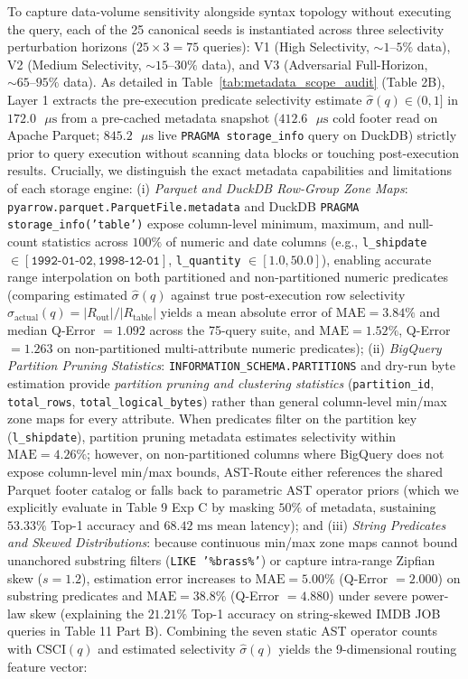 \documentclass[10pt,a4paper]{article}
\begin{document}
To capture data-volume sensitivity alongside syntax topology without executing the query, each of the 25 canonical seeds is instantiated across three selectivity perturbation horizons ($25 \times 3 = 75$ queries): V1 (High Selectivity, $\sim 1\text{--}5\%$ data), V2 (Medium Selectivity, $\sim 15\text{--}30\%$ data), and V3 (Adversarial Full-Horizon, $\sim 65\text{--}95\%$ data). As detailed in Table~\ref{tab:metadata_scope_audit} (Table 2B), Layer 1 extracts the pre-execution predicate selectivity estimate $\hat{\sigma}(q) \in (0, 1]$ in $172.0\text{ }\mu\text{s}$ from a pre-cached metadata snapshot ($412.6\text{ }\mu\text{s}$ cold footer read on Apache Parquet; $845.2\text{ }\mu\text{s}$ live \texttt{PRAGMA storage\_info} query on DuckDB) strictly prior to query execution without scanning data blocks or touching post-execution results. Crucially, we distinguish the exact metadata capabilities and limitations of each storage engine: (i) \emph{Parquet and DuckDB Row-Group Zone Maps}: \texttt{pyarrow.parquet.ParquetFile.metadata} and DuckDB \texttt{PRAGMA storage\_info('table')} expose column-level minimum, maximum, and null-count statistics across $100\%$ of numeric and date columns (e.g., \texttt{l\_shipdate} $\in [\texttt{1992-01-02}, \texttt{1998-12-01}]$, \texttt{l\_quantity} $\in [1.0, 50.0]$), enabling accurate range interpolation on both partitioned and non-partitioned numeric predicates (comparing estimated $\hat{\sigma}(q)$ against true post-execution row selectivity $\sigma_{\text{actual}}(q) = |R_{\text{out}}|/|R_{\text{table}}|$ yields a mean absolute error of $\text{MAE}=3.84\%$ and median Q-Error $=1.092$ across the 75-query suite, and $\text{MAE}=1.52\%$, Q-Error $=1.263$ on non-partitioned multi-attribute numeric predicates); (ii) \emph{BigQuery Partition Pruning Statistics}: \texttt{INFORMATION\_SCHEMA.PARTITIONS} and dry-run byte estimation provide \emph{partition pruning and clustering statistics} (\texttt{partition\_id}, \texttt{total\_rows}, \texttt{total\_logical\_bytes}) rather than general column-level min/max zone maps for every attribute. When predicates filter on the partition key (\texttt{l\_shipdate}), partition pruning metadata estimates selectivity within $\text{MAE}=4.26\%$; however, on non-partitioned columns where BigQuery does not expose column-level min/max bounds, AST-Route either references the shared Parquet footer catalog or falls back to parametric AST operator priors (which we explicitly evaluate in Table 9 Exp C by masking $50\%$ of metadata, sustaining $53.33\%$ Top-1 accuracy and $68.42\text{ ms}$ mean latency); and (iii) \emph{String Predicates and Skewed Distributions}: because continuous min/max zone maps cannot bound unanchored substring filters (\texttt{LIKE '\%brass\%'}) or capture intra-range Zipfian skew ($s=1.2$), estimation error increases to $\text{MAE}=5.00\%$ (Q-Error $=2.000$) on substring predicates and $\text{MAE}=38.8\%$ (Q-Error $=4.880$) under severe power-law skew (explaining the $21.21\%$ Top-1 accuracy on string-skewed IMDB JOB queries in Table 11 Part B). Combining the seven static AST operator counts with $\text{CSCI}(q)$ and estimated selectivity $\hat{\sigma}(q)$ yields the 9-dimensional routing feature vector:
\end{document}
